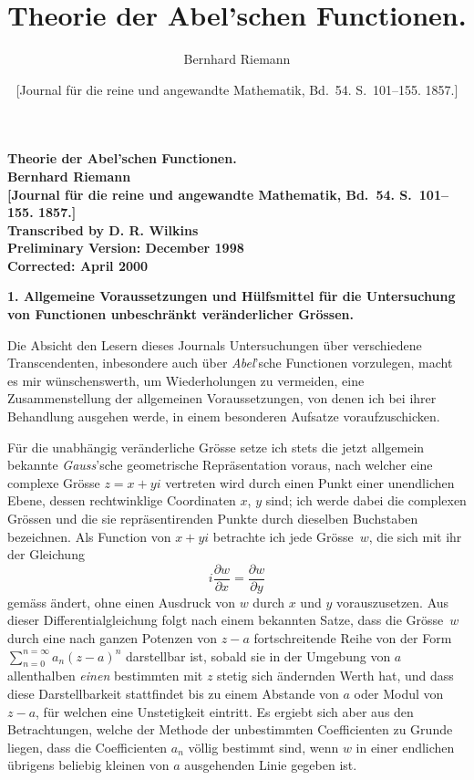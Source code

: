 \documentclass[a4paper,12pt,leqno]{article}
\begin{document}
\thispagestyle{empty}
\begin{center}
\Large\bfseries
Theorie der Abel'schen Functionen.\\[12 pt]
Bernhard Riemann\\[12 pt]
[Journal f\"{u}r die reine und angewandte Mathematik,
Bd.~54.  S.~101--155.  1857.]\\[24 pt]
\large\mdseries
Transcribed by D. R. Wilkins\\[12 pt]
Preliminary Version: December 1998\\
Corrected: April 2000
\end{center}

\newpage
\setcounter{page}{1}

\title{Theorie der Abel'schen Functionen.}
\author{Bernhard Riemann}
\date{[Journal f\"{u}r die reine und angewandte Mathematik,
Bd.~54.  S.~101--155.  1857.]}

\maketitle

\begin{center}
\large\bfseries
1.  Allgemeine Voraussetzungen und H\"{u}lfsmittel f\"{u}r
die Untersuchung von Functionen unbeschr\"{a}nkt
ver\"{a}nderlicher Gr\"{o}ssen.
\end{center}

Die Absicht den Lesern dieses Journals Untersuchungen \"{u}ber
verschiedene Transcendenten, inbesondere auch \"{u}ber
\emph{Abel}'sche Functionen vorzulegen, macht es mir
w\"{u}nschenswerth, um Wiederholungen zu vermeiden, eine
Zusammenstellung der allgemeinen Voraussetzungen, von denen ich
bei ihrer Behandlung ausgehen werde, in einem besonderen Aufsatze
voraufzuschicken.

F\"{u}r die unabh\"{a}ngig ver\"{a}nderliche Gr\"{o}sse setze ich
stets die jetzt allgemein bekannte \emph{Gauss}'sche
geometrische Repr\"{a}sentation voraus, nach welcher eine
complexe Gr\"{o}sse $z = x + yi$ vertreten wird durch einen Punkt
einer unendlichen Ebene, dessen rechtwinklige Coordinaten $x$, $y$
sind; ich werde dabei die complexen Gr\"{o}ssen und die sie
repr\"{a}sentirenden Punkte durch dieselben Buchstaben bezeichnen.
Als Function von $x + yi$ betrachte ich jede Gr\"{o}sse~$w$, die
sich mit ihr der Gleichung
\[ i \frac{\partial w}{\partial x}
   = \frac{\partial w}{\partial y} \]
gem\"{a}ss \"{a}ndert, ohne einen Ausdruck von $w$ durch $x$ und
$y$ vorauszusetzen.  Aus dieser Differentialgleichung folgt nach
einem bekannten Satze, dass die Gr\"{o}sse~$w$ durch eine nach
ganzen Potenzen von $z - a$ fortschreitende Reihe von der Form
$\sum\limits_{n=0}^{n = \infty} a_n (z - a)^n$
darstellbar ist, sobald sie in der Umgebung von $a$ allenthalben
\emph{einen} bestimmten mit $z$ stetig sich \"{a}ndernden Werth
hat, und dass diese Darstellbarkeit stattfindet bis zu einem
Abstande von $a$ oder Modul von $z - a$, f\"{u}r welchen eine
Unstetigkeit eintritt.  Es ergiebt sich aber aus den
Betrachtungen, welche der Methode der unbestimmten Coefficienten
zu Grunde liegen, dass die Coefficienten $a_n$ v\"{o}llig
bestimmt sind, \label{`Linie'} wenn $w$ in einer endlichen
\"{u}brigens beliebig kleinen von $a$ ausgehenden Linie gegeben
ist.
\end{document}
